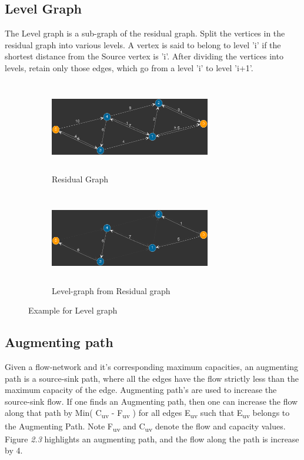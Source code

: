 \documentclass[paper=a4, fontsize=11pt]{scrartcl} %
\numberwithin{equation}{section} %
\numberwithin{figure}{section} %
\numberwithin{table}{section} %
\begin{document}

\subsection{Level Graph}

The Level graph is a sub-graph of the residual graph. Split the vertices in the residual graph into various levels. A vertex is said to belong to level 'i' if the shortest distance from the Source vertex is 'i'. After dividing the vertices into levels, retain only those edges, which go from a level 'i' to level 'i+1'.


\begin{figure}[h]
\begin{subfigure}{0.5\textwidth}
\includegraphics[width=7cm, height=4cm,center]{p5.png}
\caption{Residual Graph}
\label{fig:subim1}
\end{subfigure}
\begin{subfigure}{0.5\textwidth}
\includegraphics[width=7cm, height=4cm,center]{p7.png}
\caption{Level-graph from Residual graph}
\label{fig:subim2}
\end{subfigure}

\caption{Example for Level graph}
\label{fig:image2}
\end{figure}

\subsection{Augmenting path}

Given a flow-network and it's corresponding maximum capacities, an augmenting path is a source-sink path, where all the edges have the flow strictly less than the maximum capacity of the edge. Augmenting path's are used to increase the source-sink flow. If one finds an Augmenting path, then one can increase the flow along that path by Min( C\textsubscript{uv} - F\textsubscript{uv} ) for all edges E\textsubscript{uv} such that E\textsubscript{uv} belongs to the Augmenting Path. Note F\textsubscript{uv} and C\textsubscript{uv} denote the flow and capacity values. Figure \textit{2.3} highlights an augmenting path, and the flow along the path is increase by 4.
\end{document}
